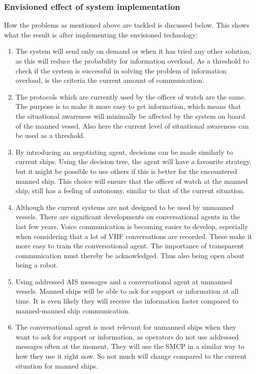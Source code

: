 \subsubsection{Envisioned effect of system implementation}
How the problems as mentioned above are tackled is discussed below. This shows what the result is after implementing the envisioned technology:
\begin{enumerate}
	\item The system will send only on demand or when it has tried any other solution, as this will reduce the probability for information overload. As a threshold to check if the system is successful in solving the problem of information overload, is the criteria the current amount of communication.
	\item The protocols which are currently used by the officer of watch are the same. The purpose is to make it more easy to get information, which means that the situational awareness will minimally be affected by the system on board of the manned vessel. Also here the current level of situational awareness can be used as a threshold.
	\item By introducing an negotiating agent, decisions can be made similarly to current ships. Using the decision tree, the agent will have a favourite strategy, but it might be possible to use others if this is better for the encountered manned ship. This choice will ensure that the officer of watch at the manned ship, still has a feeling of autonomy, similar to that of the current situation. 
	\item Although the current systems are not designed to be used by unmanned vessels. There are significant developments on conversational agents in the last few years. Voice communication is becoming easier to develop, especially when considering that a lot of \ac{VHF} conversations are recorded. These make it more easy to train the conversational agent. The importance of transparent communication must thereby be acknowledged. Thus also being open about being a robot. 
	
	\item Using addressed \ac{AIS} messages and a conversational agent at unmanned vessels. Manned ships will be able to ask for support or information at all time. It is even likely they will receive the information faster compared to manned-manned ship communication.
	\item The conversational agent is most relevant for unmanned ships when they want to ask for support or information, as operators do not use addressed messages often at the moment. They will use the \ac{SMCP} in a similar way to how they use it right now. So not much will change compared to the current situation for manned ships.
\end{enumerate}

